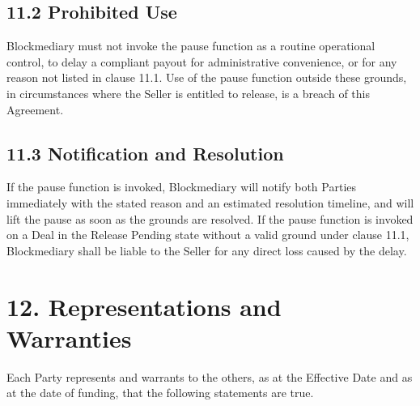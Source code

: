 \documentclass[12pt, a4paper]{article}
\begin{document}
\subsection*{11.2 Prohibited Use}

Blockmediary must not invoke the pause function as a routine operational control, to delay
a compliant payout for administrative convenience, or for any reason not listed in clause
11.1. Use of the pause function outside these grounds, in circumstances where the Seller
is entitled to release, is a breach of this Agreement.

\subsection*{11.3 Notification and Resolution}

If the pause function is invoked, Blockmediary will notify both Parties immediately with
the stated reason and an estimated resolution timeline, and will lift the pause as soon as
the grounds are resolved. If the pause function is invoked on a Deal in the Release
Pending state without a valid ground under clause 11.1, Blockmediary shall be liable to
the Seller for any direct loss caused by the delay.

\section*{12. Representations and Warranties}

Each Party represents and warrants to the others, as at the Effective Date and as at the
date of funding, that the following statements are true.
\end{document}
